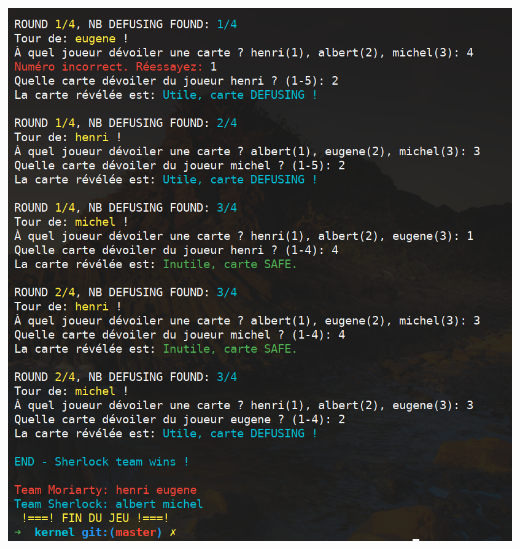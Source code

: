 \documentclass[a4paper]{article}
\begin{document}
\begin{center}
    \includegraphics[scale=1.4]{img/fin.png}
\end{center}
\end{document}
